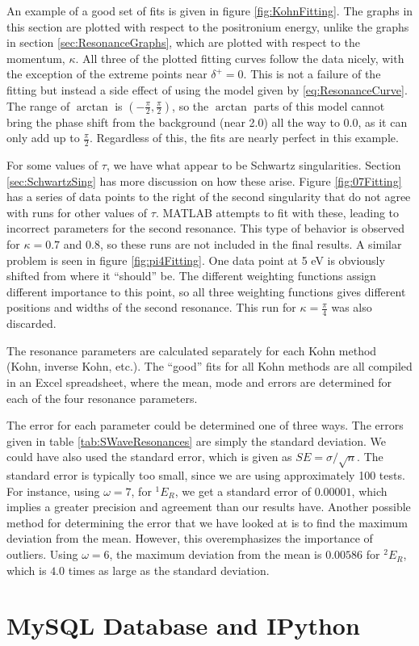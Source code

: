 \documentclass[Dissertation.tex]{subfiles}
\begin{document}
An example of a good set of fits is given in figure \ref{fig:KohnFitting}.  The graphs in this section are plotted with respect to the positronium energy, unlike the graphs in section \ref{sec:ResonanceGraphs}, which are plotted with respect to the momentum, $\kappa$.  All three of the plotted fitting curves follow the data nicely, with the exception of the extreme points near $\delta^+ = 0$.  This is not a failure of the fitting but instead a side effect of using the model given by \ref{eq:ResonanceCurve}.  The range of $\arctan$ is $(-\frac{\pi}{2},\frac{\pi}{2})$, so the $\arctan$ parts of this model cannot bring the phase shift from the background (near 2.0) all the way to 0.0, as it can only add up to $\frac{\pi}{2}$.  Regardless of this, the fits are nearly perfect in this example.

For some values of $\tau$, we have what appear to be Schwartz singularities.  Section \ref{sec:SchwartzSing} has more discussion on how these arise.  Figure \ref{fig:07Fitting} has a series of data points to the right of the second singularity that do not agree with runs for other values of $\tau$.  MATLAB attempts to fit with these, leading to incorrect parameters for the second resonance.  This type of behavior is observed for $\kappa = 0.7$ and $0.8$, so these runs are not included in the final results.  A similar problem is seen in figure \ref{fig:pi4Fitting}.  One data point at 5 eV is obviously shifted from where it ``should'' be.  The different weighting functions assign different importance to this point, so all three weighting functions gives different positions and widths of the second resonance.  This run for $\kappa = \frac{\pi}{4}$ was also discarded. 

The resonance parameters are calculated separately for each Kohn method (Kohn, inverse Kohn, etc.).  The ``good'' fits for all Kohn methods are all compiled in an Excel spreadsheet, where the mean, mode and errors are determined for each of the four resonance parameters.

The error for each parameter could be determined one of three ways.  The errors given in table \ref{tab:SWaveResonances} are simply the standard deviation.  We could have also used the standard error, which is given as $SE = \sigma / \sqrt{n}$.  The standard error is typically too small, since we are using approximately 100 tests.  For instance, using $\omega = 7$, for $^1E_R$, we get a standard error of $0.00001$, which implies a greater precision and agreement than our results have.  Another possible method for determining the error that we have looked at is to find the maximum deviation from the mean.  However, this overemphasizes the importance of outliers.  Using $\omega = 6$, the maximum deviation from the mean is $0.00586$ for $^2E_R$, which is $4.0$ times as large as the standard deviation. 





\section{MySQL Database and IPython}
\label{sec:MySQL}


\biblio
\end{document}
